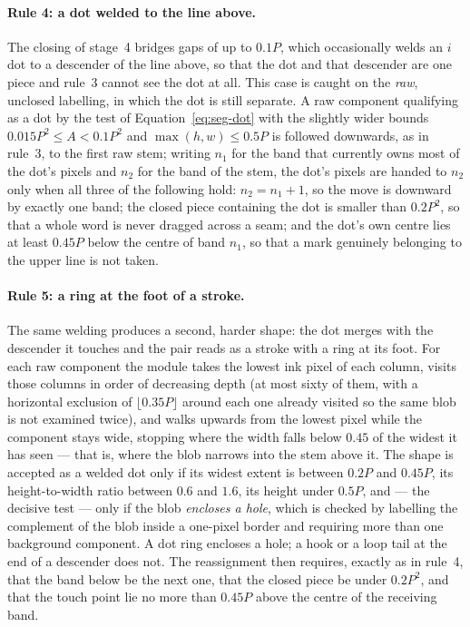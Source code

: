 \paragraph{Rule 4: a dot welded to the line above.}
The closing of stage~4 bridges gaps of up to $0.1P$, which occasionally welds an $i$ dot to a descender of the line above, so that the dot and that descender are one piece and rule~3 cannot see the dot at all.
This case is caught on the \emph{raw}, unclosed labelling, in which the dot is still separate.
A raw component qualifying as a dot by the test of Equation~\ref{eq:seg-dot} with the slightly wider bounds $0.015P^2\le A<0.1P^2$ and $\max(h,w)\le0.5P$ is followed downwards, as in rule~3, to the first raw stem; writing $n_1$ for the band that currently owns most of the dot's pixels and $n_2$ for the band of the stem, the dot's pixels are handed to $n_2$ only when all three of the following hold: $n_2=n_1+1$, so the move is downward by exactly one band; the closed piece containing the dot is smaller than $0.2P^2$, so that a whole word is never dragged across a seam; and the dot's own centre lies at least $0.45P$ below the centre of band $n_1$, so that a mark genuinely belonging to the upper line is not taken.

\paragraph{Rule 5: a ring at the foot of a stroke.}
The same welding produces a second, harder shape: the dot merges with the descender it touches and the pair reads as a stroke with a ring at its foot.
For each raw component the module takes the lowest ink pixel of each column, visits those columns in order of decreasing depth (at most sixty of them, with a horizontal exclusion of $\lfloor0.35P\rfloor$ around each one already visited so the same blob is not examined twice), and walks upwards from the lowest pixel while the component stays wide, stopping where the width falls below $0.45$ of the widest it has seen --- that is, where the blob narrows into the stem above it.
The shape is accepted as a welded dot only if its widest extent is between $0.2P$ and $0.45P$, its height-to-width ratio between $0.6$ and $1.6$, its height under $0.5P$, and --- the decisive test --- only if the blob \emph{encloses a hole}, which is checked by labelling the complement of the blob inside a one-pixel border and requiring more than one background component.
A dot ring encloses a hole; a hook or a loop tail at the end of a descender does not.
The reassignment then requires, exactly as in rule~4, that the band below be the next one, that the closed piece be under $0.2P^2$, and that the touch point lie no more than $0.45P$ above the centre of the receiving band.

